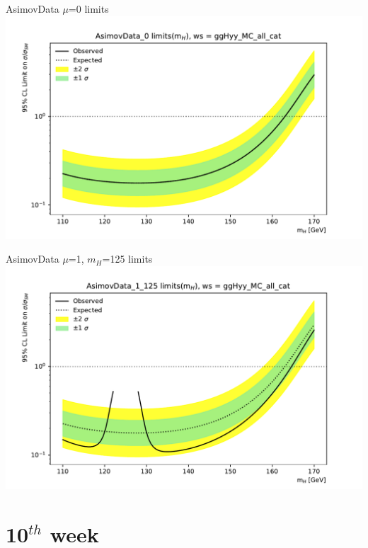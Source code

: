 \documentclass[10pt,UKenglish, leqno, xcolor = dvipsnames]{beamer}
\begin{document}
		\begin{frame}{AsimovData $\mu$=0 limits}
			\vfill
			\includegraphics[width=1.\textwidth]{../images/week_9/plot_AsimovData_0_ggHyy_MC_all_cat.pdf}
			\vfill
		\end{frame}
		
		\begin{frame}{AsimovData $\mu$=1, $m_H$=125 limits}
			\vfill
			\includegraphics[width=1.\textwidth]{../images/week_9/plot_AsimovData_1_125_ggHyy_MC_all_cat.pdf}
			\vfill
		\end{frame}
	
	\section{10$^{th}$ week}
	\SectionPage
	
\end{document}
